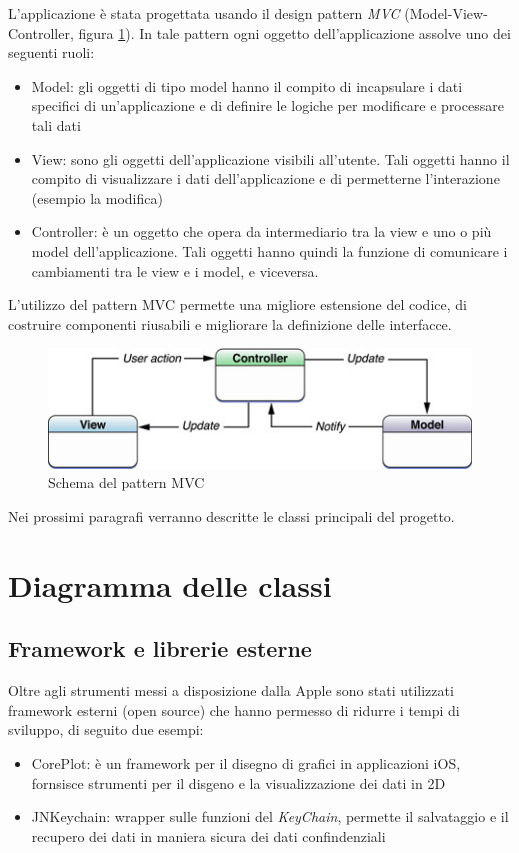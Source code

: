 L'applicazione è stata progettata usando il design pattern \emph{MVC} (Model-View-Controller, figura \ref{fig:mvc}). In tale pattern ogni oggetto dell'applicazione assolve uno dei seguenti ruoli:
\begin{itemize}
 \item Model: gli oggetti di tipo model hanno il compito di incapsulare i dati specifici di un'applicazione e di definire le logiche per modificare e processare tali dati
 \item View: sono gli oggetti dell'applicazione visibili all'utente. Tali oggetti hanno il compito di visualizzare i dati dell'applicazione e di permetterne l'interazione (esempio la modifica)
 \item Controller: è un oggetto che opera da intermediario tra la view e uno o più model dell'applicazione. Tali oggetti hanno quindi la funzione di comunicare i cambiamenti tra le view e i model, e viceversa.
\end{itemize}

L'utilizzo del pattern MVC permette una migliore estensione del codice, di costruire componenti riusabili e migliorare la definizione delle interfacce.

\begin{figure}[!htbp]
\centering
\includegraphics[scale=0.70]{architettura/mvc.png}
\caption{Schema del pattern MVC}
\label{fig:mvc}
\end{figure}

Nei prossimi paragrafi verranno descritte le classi principali del progetto.

\section{Diagramma delle classi}

\subsection{Framework e librerie esterne}
Oltre agli strumenti messi a disposizione dalla Apple sono stati utilizzati framework esterni (open source) che hanno permesso di ridurre i tempi di sviluppo, di seguito due esempi:
\begin{itemize}
 \item CorePlot: è un framework per il disegno di grafici in applicazioni iOS, fornsisce strumenti per il disgeno e la visualizzazione dei dati in 2D
 \item JNKeychain: wrapper sulle funzioni del \emph{KeyChain}, permette il salvataggio e il recupero dei dati in maniera sicura dei dati confindenziali
\end{itemize}


